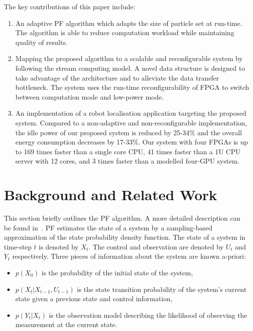 The key contributions of this paper include:

\begin{enumerate}
\item An adaptive PF algorithm which adapts the size of particle set at run-time. 
The algorithm is able to reduce computation workload while maintaining quality of results.
\item Mapping the proposed algorithm to a scalable and reconfigurable system by following the stream computing model.
A novel data structure is designed to take advantage of the architecture and to alleviate the data transfer bottleneck.
The system uses the run-time reconfigurability of FPGA to switch between computation mode and low-power mode.
\item An implementation of a robot localisation application targeting the proposed system. 
Compared to a non-adaptive and non-reconfigurable implementation, the idle power of our proposed system is reduced by 25-34\% and the overall energy consumption decreases by 17-33\%.
Our system with four FPGAs is up to 169 times faster than a single core CPU, 41 times faster than a 1U CPU server with 12 cores, and 3 times faster than a modelled four-GPU system.
\end{enumerate}

\section{Background and Related Work}

This section briefly outlines the PF algorithm.
A more detailed description can be found in~\cite{doucet01}. 
PF estimates the state of a system by a sampling-based approximation of the state probability density function. 
The state of a system in time-step $t$ is denoted by $X_t$. 
The control and observation are denoted by $U_t$ and $Y_t$ respectively. 
Three pieces of information about the system are known a-priori: 
\begin{itemize}
\item $p(X_0)$ is the probability of the initial state of the system, 
\item $p(X_t|X_{t-1},U_{t-1})$ is the state transition probability of the system's current state given a previous state and control information, 
\item $p(Y_t|X_t)$ is the observation model describing the likelihood of observing the measurement at the current state.
\end{itemize}

